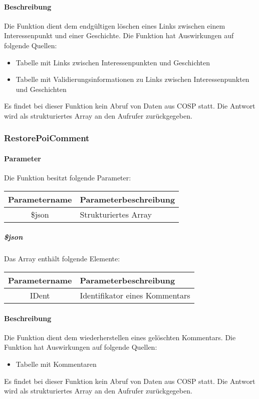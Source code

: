 \paragraph{Beschreibung} Die Funktion dient dem endgültigen löschen eines Links zwischen einem Interessenpunkt und einer Geschichte. Die Funktion hat Auswirkungen auf folgende Quellen:
\begin{itemize}
	\item Tabelle mit Links zwischen Interessenpunkten und Geschichten
	\item Tabelle mit Validierungsinformationen zu Links zwischen Interessenpunkten und Geschichten
\end{itemize}
Es findet bei dieser Funktion kein Abruf von Daten aus {\glqq COSP\grqq} statt. Die Antwort wird als strukturiertes Array an den Aufrufer zurückgegeben.
\subsubsection{RestorePoiComment}
\paragraph{Parameter} Die Funktion besitzt folgende Parameter:
\begin{table}[H]
	\begin{tabular}{|c|p{11cm}|}
		\hline
		\textbf{Parametername} & \textbf{Parameterbeschreibung} \\ \hline
		\$json & Strukturiertes Array \\ \hline
	\end{tabular}
\end{table}
\subparagraph{\$json}Das Array enthält folgende Elemente:
\begin{table}[H]
	\begin{tabular}{|c|p{11cm}|}
		\hline
		\textbf{Parametername} & \textbf{Parameterbeschreibung} \\ \hline
		IDent & Identifikator eines Kommentars \\ \hline
	\end{tabular}
\end{table}
\paragraph{Beschreibung} Die Funktion dient dem wiederherstellen eines gelöschten Kommentars. Die Funktion hat Auswirkungen auf folgende Quellen:
\begin{itemize}
	\item Tabelle mit Kommentaren
\end{itemize}
Es findet bei dieser Funktion kein Abruf von Daten aus {\glqq COSP\grqq} statt. Die Antwort wird als strukturiertes Array an den Aufrufer zurückgegeben.
